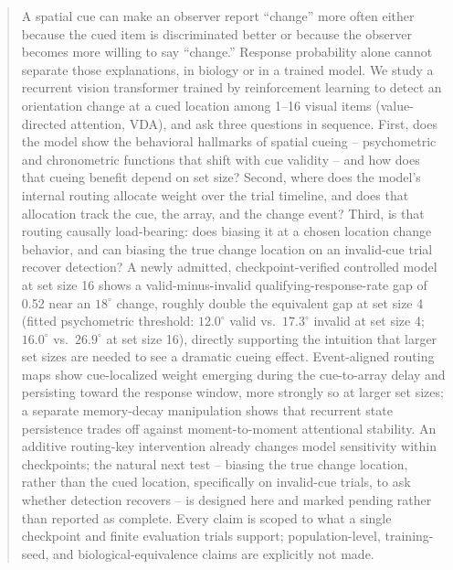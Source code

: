 \documentclass[11pt,a4paper]{article}
\begin{document}
\begin{abstract}
A spatial cue can make an observer report ``change'' more often either because the cued item is discriminated better or because the observer becomes more willing to say ``change.'' Response probability alone cannot separate those explanations, in biology or in a trained model. We study a recurrent vision transformer trained by reinforcement learning to detect an orientation change at a cued location among 1--16 visual items (value-directed attention, VDA), and ask three questions in sequence. First, does the model show the behavioral hallmarks of spatial cueing -- psychometric and chronometric functions that shift with cue validity -- and how does that cueing benefit depend on set size? Second, where does the model's internal routing allocate weight over the trial timeline, and does that allocation track the cue, the array, and the change event? Third, is that routing causally load-bearing: does biasing it at a chosen location change behavior, and can biasing the true change location on an invalid-cue trial recover detection? A newly admitted, checkpoint-verified controlled model at set size 16 shows a valid-minus-invalid qualifying-response-rate gap of 0.52 near an $18^\circ$ change, roughly double the equivalent gap at set size 4 (fitted psychometric threshold: $12.0^\circ$ valid vs.\ $17.3^\circ$ invalid at set size 4; $16.0^\circ$ vs.\ $26.9^\circ$ at set size 16), directly supporting the intuition that larger set sizes are needed to see a dramatic cueing effect. Event-aligned routing maps show cue-localized weight emerging during the cue-to-array delay and persisting toward the response window, more strongly so at larger set sizes; a separate memory-decay manipulation shows that recurrent state persistence trades off against moment-to-moment attentional stability. An additive routing-key intervention already changes model sensitivity within checkpoints; the natural next test -- biasing the true change location, rather than the cued location, specifically on invalid-cue trials, to ask whether detection recovers -- is designed here and marked pending rather than reported as complete. Every claim is scoped to what a single checkpoint and finite evaluation trials support; population-level, training-seed, and biological-equivalence claims are explicitly not made.
\end{abstract}

\tableofcontents
\clearpage
\end{document}
